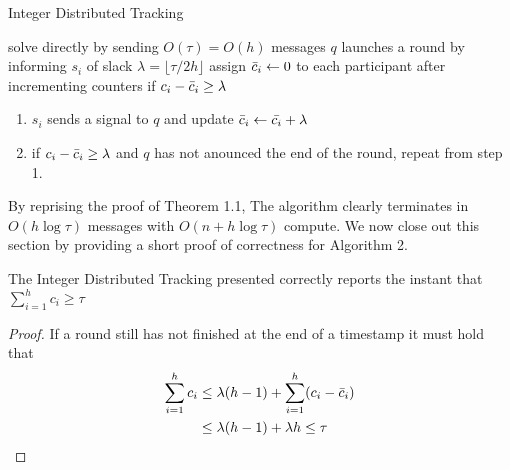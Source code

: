 \begin{algorithm}
\caption{Integer Distributed Tracking }\label{Algorithm 3}
\begin{algorithmic}
        \State solve directly by sending $O(\tau) = O(h)$ messages
        \State $q$ launches a round by informing $s_i$ of slack $\lambda = \lfloor \tau/2h \rfloor$
        \State assign $\Bar{c}_i \gets 0$ to each participant
        \State after incrementing counters if $c_i - \Bar{c}_i \geq \lambda$
        \begin{enumerate}
            \item $s_i$ sends a signal to $q$ and update $\Bar{c}_i \gets \Bar{c_i} + \lambda$
            \item if $c_i - \Bar{c}_i \geq \lambda$ and $q$ has not anounced the end of the round, repeat from step 1.
        \end{enumerate}
    \EndIf
\end{algorithmic}
\end{algorithm}
By reprising the proof of Theorem 1.1, The algorithm clearly terminates in $O(h\log\tau)$ messages with $O(n + h\log\tau)$ compute. We now close out this section by providing a short proof of correctness for Algorithm 2. 
\begin{theorem}[Correctness] The Integer Distributed Tracking presented correctly reports the instant that $\sum_{i=1}^{h}c_i \geq \tau$
\end{theorem}
\begin{proof}
    If a round still has not finished at the end of a timestamp it must hold that 
    \begin{align*}
        \sum_{i=1}^{h}c_i &\leq \lambda (h-1) + \sum_{i=1}^{h}(c_i - \Bar{c}_i) \\
        &\leq \lambda(h-1) + \lambda h \leq \tau
    \end{align*}
\end{proof}
